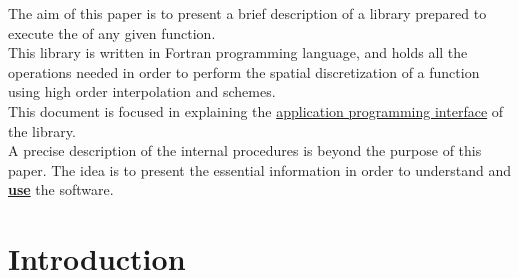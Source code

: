 


The aim of this paper is to present a brief description of a library
prepared to execute the  of any given function. \\

This library is written in Fortran programming language, and holds all the
operations needed in order to perform the spatial discretization of a function
using high order interpolation and  schemes. \\

This document is focused in explaining the \underline{application programming
interface} of the library. \\

A precise description of the internal procedures is beyond the purpose of this paper. 
The idea is to present the essential information in order to
understand and \textbf{\underline{use}} the software. 

\newpage

\section{Introduction}

